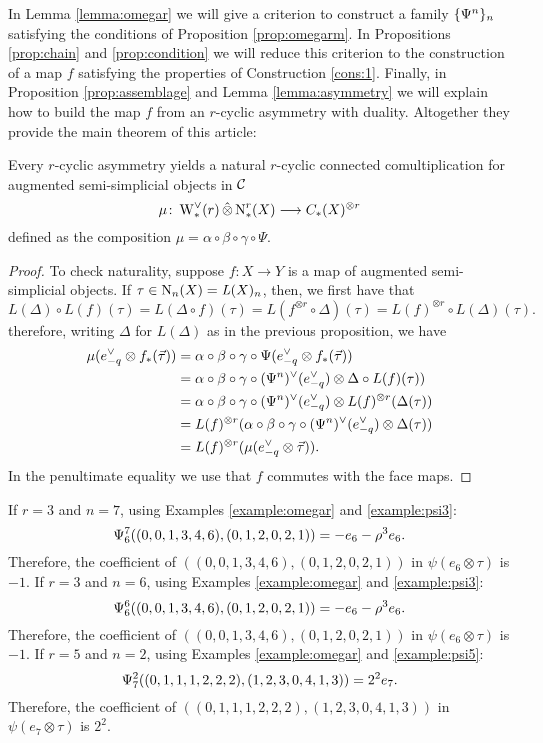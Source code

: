 In Lemma \ref{lemma:omegar} we will give a criterion to construct a family $\{\Psiom^n\}_n$ satisfying the conditions of Proposition \ref{prop:omegarm}. In Propositions \ref{prop:chain} and \ref{prop:condition} we will reduce this criterion to the construction of a map $f$ satisfying the properties of Construction \ref{cons:1}. Finally, in Proposition \ref{prop:assemblage} and Lemma \ref{lemma:asymmetry} we will explain how to build the map $f$ from an $r$-cyclic asymmetry with duality. Altogether they provide the main theorem of this article:

\begin{theorem}\label{thm2:mainthm} Every $r$-cyclic asymmetry yields a natural $r$-cyclic connected comultiplication for augmented semi-simplicial objects in $\cC$
\[
	\mu\colon \rWd(r)\hotimes \rchains(X)\lra \ucadenas(X)^{\otimes r}
\]
defined as the composition
	$
	\mu = \alpha\circ\beta\circ\gamma\circ \Psi.
	$
\end{theorem}

\begin{proof}
	To check naturality, suppose $f\colon X\to Y$ is a map of augmented semi-simplicial objects. If $\tau\in \chains[n](X) = \abel(X)_n$, then, we first have that
	\[
		L(\Delta)\circ L(f)(\tau) = L(\Delta\circ f)(\tau) = L(f^{\otimes r}\circ \Delta)(\tau) = L(f)^{\otimes r}\circ L(\Delta)(\tau).
	\]
	therefore, writing $\Delta$ for $L(\Delta)$ as in the previous proposition, we have
	\begin{align*}
	\mu(e^\dd_{-q}\otimes f_*(\vec{\tau})) 
		&=	\alpha\circ\beta\circ\gamma\circ \Psi(e_{-q}^\vee\otimes f_*(\vec{\tau}))
		\\
		&= \alpha\circ\beta\circ\gamma\circ(\Psiom^n)^\vee(e_{-q}^\vee)\otimes \Delta\circ L(f)(\tau))
		\\
		&= \alpha\circ\beta\circ\gamma\circ(\Psiom^n)^\vee(e_{-q}^\vee)\otimes L(f)^{\otimes r}(\Delta(\tau))
		\\
		&= L(f)^{\otimes r}(\alpha\circ\beta\circ\gamma\circ(\Psiom^n)^\vee(e_{-q}^\vee)\otimes \Delta(\tau))
		\\
		&= L(f)^{\otimes r}(\mu(e^\dd_{-q}\otimes \vec{\tau})).
	\end{align*}
	In the penultimate equality we use that $f$ commutes with the face maps.
\end{proof}

\begin{example}\label{ex:omegarn} If $r=3$ and $n=7$, using Examples \ref{example:omegar} and \ref{example:psi3}:
	\[
		\Psiom_6^7((0,0,1,3,4,6),(0,1,2,0,2,1)) = -e_6-\rho^3e_6.
	\]
	Therefore, the coefficient of $((0,0,1,3,4,6),(0,1,2,0,2,1))$ in $\psi(e_6\otimes \tau)$ is $-1$.
 If $r=3$ and $n=6$, using Examples \ref{example:omegar} and \ref{example:psi3}:
	\[
		\Psiom_6^6((0,0,1,3,4,6),(0,1,2,0,2,1)) = -e_6-\rho^3e_6.
	\]
	Therefore, the coefficient of $((0,0,1,3,4,6),(0,1,2,0,2,1))$ in $\psi(e_6\otimes \tau)$ is $-1$.
 If $r=5$ and $n=2$, using Examples \ref{example:omegar} and \ref{example:psi5}:
	\[
		\Psiom_7^2((0,1,1,1,2,2,2),(1,2,3,0,4,1,3)) = 2^2e_7.
	\]
Therefore, the coefficient of $((0,1,1,1,2,2,2),(1,2,3,0,4,1,3))$ in $\psi(e_7\otimes\tau)$ is $2^2$.
\end{example}

